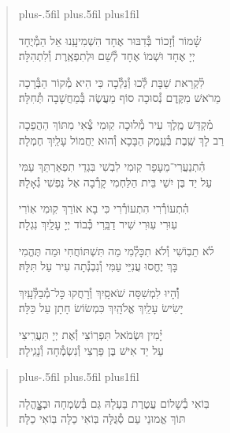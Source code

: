 \documentclass[twoside, openany, parskip=half, 11pt]{book}
\begin{document}
\begin{quote}
\leftskip=0pt plus-.5fil
\rightskip=0pt plus.5fil
\parfillskip=0pt plus1fil


\lechadodi

שָׁ֗מוֹר וְ֯זָכוֹר בְּ֯דִבּוּר אֶחָד \hfill
הִשְׁמִיעָֽנוּ אֵל הַמְ֯יֻחָד \\
יְיָ אֶחָד וּשְׁמוֹ אֶחָד \hfill
לְ֯שֵׁם וּלְתִפְאֶֽרֶת וְ֯לִתְהִלָּה׃

\lechadodi

לִ֗קְרַאת שַׁבָּת לְ֯כוּ וְ֯נֵלְ֯כָה \hfill
כִּי הִיא מְ֯קוֹר הַבְּ֯רָכָה \\
מֵרֹאשׁ מִקֶּֽדֶם נְ֯סוּכָה \hfill
סוֹף מַעֲשֶׂה בְּ֯מַחֲשָׁבָה תְּ֯חִלָּה׃

\lechadodi

מִ֗קְדַּשׁ מֶֽלֶךְ עִיר מְ֯לוּכָה \hfill
קֽוּמִי צְ֯אִי מִתּוֹךְ הַהֲפֵכָה \\
רַב לָךְ שֶֽׁבֶת בְּ֯עֵֽמֶק הַבָּכָא \hfill
וְ֯הוּא יַחֲמוֹל עָלַֽיִךְ חֶמְלָה׃

\lechadodi

הִ֗תְנַעֲרִי־מֵעָפָר קֽוּמִי \hfill
לִבְשִׁי בִּגְדֵי תִפְאַרְתֵּךְ עַמִּי \\
עַל יַד בֶּן יִשַׁי בֵּית הַלַּחְמִי \hfill
קָרְ֯בָה אֶל נַפְשִׁי גְ֯אָלָהּ׃

\lechadodi

הִ֗תְעוֹרְ֯רִי הִתְעוֹרְ֯רִי \hfill
כִּי בָא אוֹרֵךְ קֽוּמִי אֽוֹרִי \\
עֽוּרִי עֽוּרִי שִׁיר דַבֵּֽרִי \hfill
כְּ֯בוֹד יְיָ עָלַֽיִךְ נִגְלָה׃

\lechadodi

לֹ֗א תֵבֽוֹשִׁי וְ֯לֹא תִכָּלְ֯מִי \hfill
מַה תִּשְׁתּוֹחֲחִי וּמַה תֶּהֱמִי \\
בָּךְ יֶחֱסוּ עֲנִיֵּי עַמִּי \hfill
וְ֯נִבְנְ֯תָה עִיר עַל תִּלָּהּ׃

\lechadodi

וְ֯֗הָיוּ לִמְשִׁסָּה שֹׁאסָֽיִךְ \hfill
וְ֯רָחֲקוּ כׇּל־מְ֯בַלְּ֯עָֽיִךְ \\
יָשִׂישׂ עָלַֽיִךְ אֱלֹהָֽיִךְ \hfill
כִּמְשׂוֹשׂ חָתָן עַל כַּלָּה׃

\lechadodi

יָ֗מִין וּשְׂמֹאל תִּפְרֽוֹצִי \hfill
וְ֯אֶת יְיָ תַּעֲרִֽיצִי \\
עַל יַד אִישׁ בֶּן פַּרְצִי \hfill
וְ֯נִשְׂמְ֯חָה וְ֯נָגִֽילָה׃

\lechadodi

\end{quote}



\begin{quote}
\leftskip=0pt plus-.5fil
\rightskip=0pt plus.5fil
\parfillskip=0pt plus1fil

בּֽוֹאִי בְ֯שָׁלוֹם עֲטֶרֶת בַּעְלָהּ \hfill
גַּם בְּ֯שִׂמְחָה וּבְצׇׇׇׇׇׇׇׇָהֳלָה \\
תּוֹךְ אֱמוּנֵי עַם סְ֯גֻּלָּה \hfill
בּֽוֹאִי כַלָּה בּֽוֹאִי כַלָּה׃

\lechadodi

\end{quote}
\end{document}
